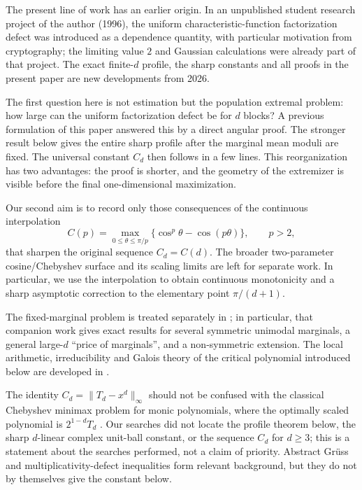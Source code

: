 \documentclass[11pt]{article}
\theoremstyle{definition}\newtheorem{definition}[theorem]{Definition}
\theoremstyle{remark}\newtheorem{remark}[theorem]{Remark}
\begin{document}
The present line of work has an earlier origin. In an unpublished student research project of the author (1996),
the uniform characteristic-function factorization defect was introduced as a dependence quantity, with particular
motivation from cryptography; the limiting value $2$ and Gaussian calculations were already part of that project.
The exact finite-$d$ profile, the sharp constants and all proofs in the present paper are new developments from 2026.

The first question here is not estimation but the population extremal problem: how large can the uniform
factorization defect be for $d$ blocks? A previous formulation of this paper answered this by a direct angular proof.
The stronger result below gives the entire sharp profile after the marginal mean moduli are fixed. The universal
constant $C_d$ then follows in a few lines. This reorganization has two advantages: the proof is shorter, and the
geometry of the extremizer is visible before the final one-dimensional maximization.

Our second aim is to record only those consequences of the continuous interpolation
\[
C(p)=\max_{0\le\theta\le\pi/p}\{\cos^p\theta-\cos(p\theta)\},\qquad p>2,
\]
that sharpen the original sequence $C_d=C(d)$. The broader two-parameter cosine/Chebyshev surface and its scaling
limits are left for separate work. In particular, we use the interpolation to obtain continuous monotonicity and a
sharp asymptotic correction to the elementary point $\pi/(d+1)$.

The fixed-marginal problem is treated separately in \cite{MartinevskiMarginals}; in particular, that companion work gives exact results for several symmetric unimodal marginals, a general large-$d$ ``price of marginals'', and a non-symmetric extension. The local arithmetic, irreducibility and Galois theory of the critical polynomial introduced below are developed in \cite{MartinevskiCritical}.

The identity $C_d=\|T_d-x^d\|_\infty$ should not be confused with the classical Chebyshev minimax problem for monic
polynomials, where the optimally scaled polynomial is $2^{1-d}T_d$ \cite{Rivlin1990}. Our searches did not locate the
profile theorem below, the sharp $d$-linear complex unit-ball constant, or the sequence $C_d$ for $d\ge3$; this is a
statement about the searches performed, not a claim of priority. Abstract Gr\"uss and multiplicativity-defect
inequalities form relevant background, but they do not by themselves give the constant below.
\end{document}
